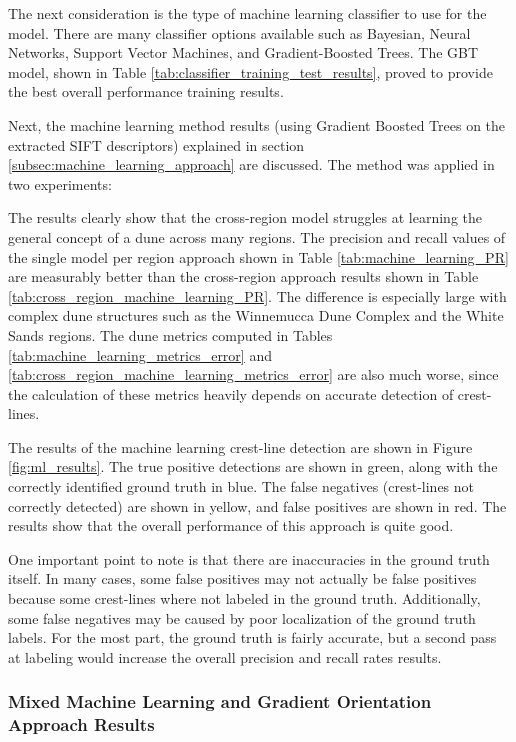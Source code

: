 The next consideration is the type of machine learning classifier to use for the model. There are many classifier options available such as Bayesian, Neural Networks, Support Vector Machines, and Gradient-Boosted Trees. The GBT model, shown in Table \ref{tab:classifier_training_test_results}, proved to provide the best overall performance training results.

Next, the machine learning method results (using Gradient Boosted Trees on the extracted SIFT descriptors) explained in section \ref{subsec:machine_learning_approach} are discussed. The method was applied in two experiments: 

The results clearly show that the cross-region model struggles at learning the general concept of a dune across many regions. The precision and recall values of the single model per region approach shown in Table \ref{tab:machine_learning_PR} are measurably better than the cross-region approach results shown in Table \ref{tab:cross_region_machine_learning_PR}. The difference is especially large with complex dune structures such as the Winnemucca Dune Complex and the White Sands regions. The dune metrics computed in Tables \ref{tab:machine_learning_metrics_error} and \ref{tab:cross_region_machine_learning_metrics_error} are also much worse, since the calculation of these metrics heavily depends on accurate detection of crest-lines.

The results of the machine learning crest-line detection are shown in Figure \ref{fig:ml_results}. The true positive detections are shown in green, along with the correctly identified ground truth in blue. The false negatives (crest-lines not correctly detected) are shown in yellow, and false positives are shown in red. The results show that the overall performance of this approach is quite good. 

One important point to note is that there are inaccuracies in the ground truth itself. In many cases, some false positives may not actually be false positives because some crest-lines where not labeled in the ground truth. Additionally, some false negatives may be caused by poor localization of the ground truth labels. For the most part, the ground truth is fairly accurate, but a second pass at labeling would increase the overall precision and recall rates results.

\subsubsection*{Mixed Machine Learning and Gradient Orientation Approach Results}


